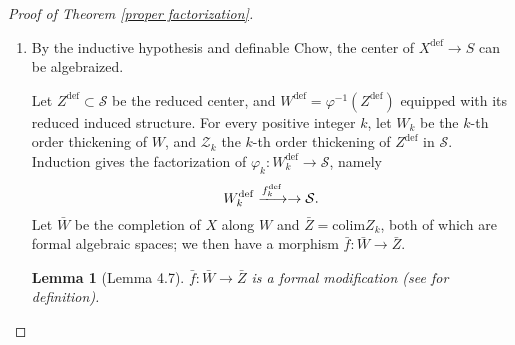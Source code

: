 \documentclass{amsart}
\newtheorem{lemma}[theorem]{Lemma}
\theoremstyle{definition}
\numberwithin{equation}{section}
\newcommand{\definable}{\mathrm{def}}
\begin{document}
\begin{proof}[Proof of Theorem \ref{proper factorization}]
\begin{enumerate}
    Obviously $\mathrm{Hilb}(X_{\mathcal{U}})$ is an open subset of $\mathrm{Hilb}(X)$.
    Let $B$ be the closure of the image of $U$ in $\mathrm{Hilb}(X)$,
    $V_B \to B$ the restriction of the universal family,
    $\widetilde{B} \to B$ the normalization,
    and $V_{\widetilde{B}}\to B$ the base-change of the universal family. We then have solid diagrams
    \[\begin{tikzcd}
      &                           & V_{\widetilde{B}} \arrow[ld] \arrow[rd] &                          &  &                         & (V_{\widetilde{B}})^\definable \arrow[ld] \arrow[rd] \arrow[dd] &                                                     \\
      & V_B \arrow[rd] \arrow[ld] &                                         & \widetilde{B} \arrow[ld] &  & X^\definable \arrow[rd] &                                                                 & \widetilde{B}^\definable \arrow[ld, "\psi", dashed] \\
    X &                           & B                                       &                          &  &                         & \mathcal{S}                                                     &                                                    
    \end{tikzcd}\]
    The resulting morphism $\psi$ is a proper modification, as it is proper
    ($(V_{\widetilde{B}})^\definable \to \mathcal{S}$ is proper and $V_{\widetilde{B}}\to \widetilde{B}$ is surjective)
    and an isomorphism over $\mathcal{U}$.

    \item
    By the inductive hypothesis and definable Chow, the center of $X^\definable \to S$ can be algebraized.

    Let $Z^\definable \subset \mathcal{S}$ be the reduced center, and $W^\definable = \varphi^{-1}(Z^\definable)$
    equipped with its reduced induced structure.
    For every positive integer $k$, let $W_k$ be the $k$-th order thickening of $W$,
    and $\mathcal{Z}_k$ the $k$-th order thickening of $Z^\definable$ in $\mathcal{S}$.
    Induction gives the factorization of $\varphi_k: W_k^\definable \to \mathcal{S}$, namely
    \[
      W_k^\definable  \xlongrightarrow{f_k^\definable} \to \mathcal{S}.
    \]
    Let $\bar{W}$ be the completion of $X$ along $W$ and $\bar{Z} = \mathrm{colim} Z_k$,
    both of which are formal algebraic spaces; we then have a morphism $\bar{f}: \bar{W} \to \bar{Z}$. 
    
    \begin{lemma}[Lemma 4.7]
      $\bar{f}: \bar{W} \to \bar{Z}$ is a formal modification (see \cite[Definition (1.7)]{zbMATH03283964} for definition).
    \end{lemma}
    

\end{enumerate}
\end{proof}
\end{document}
